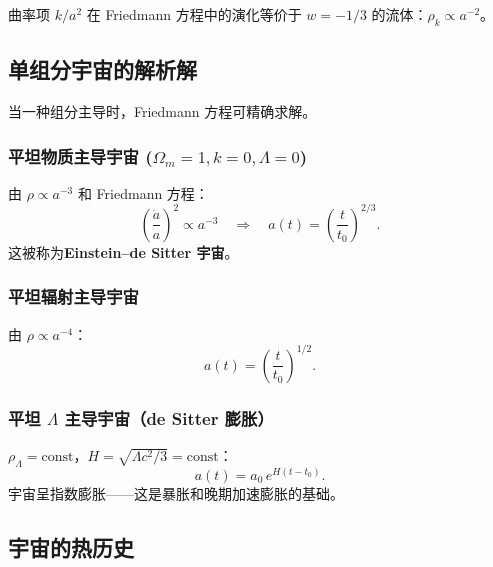\begin{note}[曲率项的有效状态方程]
曲率项 $k/a^2$ 在 Friedmann 方程中的演化等价于 $w = -1/3$ 的流体：$\rho_k \propto a^{-2}$。
\end{note}

\subsection{单组分宇宙的解析解}

当一种组分主导时，Friedmann 方程可精确求解。

\subsubsection{平坦物质主导宇宙 ($\Omega_m = 1, k=0, \Lambda=0$)}

由 $\rho \propto a^{-3}$ 和 Friedmann 方程：
\begin{equation}
    \left(\frac{\dot{a}}{a}\right)^2 \propto a^{-3}
    \quad\Longrightarrow\quad
    \boxed{a(t) = \left(\frac{t}{t_0}\right)^{2/3}}.
    \label{eq:Einstein_deSitter}
\end{equation}
这被称为\textbf{Einstein--de Sitter 宇宙}。

\subsubsection{平坦辐射主导宇宙}

由 $\rho \propto a^{-4}$：
\begin{equation}
    \boxed{a(t) = \left(\frac{t}{t_0}\right)^{1/2}}.
    \label{eq:radiation_era}
\end{equation}

\subsubsection{平坦 $\Lambda$ 主导宇宙（de Sitter 膨胀）}

$\rho_\Lambda = \text{const}$，$H = \sqrt{\Lambda c^2 / 3} = \text{const}$：
\begin{equation}
    \boxed{a(t) = a_0 \, e^{H(t-t_0)}}.
    \label{eq:deSitter}
\end{equation}
宇宙呈指数膨胀——这是暴胀和晚期加速膨胀的基础。

\subsection{宇宙的热历史}

